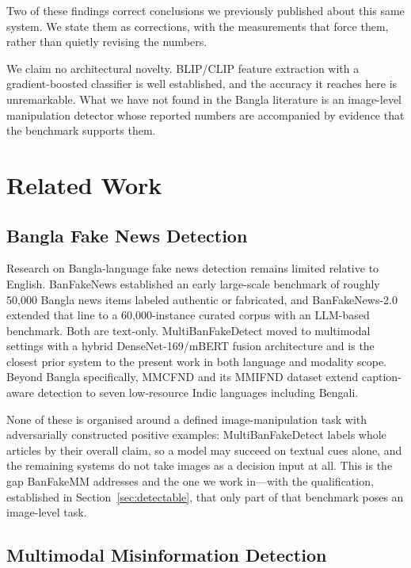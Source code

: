 Two of these findings correct conclusions we previously published about this
same system. We state them as corrections, with the measurements that force
them, rather than quietly revising the numbers.

We claim no architectural novelty. BLIP/CLIP feature extraction with a
gradient-boosted classifier is well established, and the accuracy it reaches
here is unremarkable. What we have not found in the Bangla literature is an
image-level manipulation detector whose reported numbers are accompanied by
evidence that the benchmark supports them.

\section{Related Work}

\subsection{Bangla Fake News Detection}

Research on Bangla-language fake news detection remains limited relative to
English. BanFakeNews \cite{banfakenews} established an early large-scale
benchmark of roughly 50{,}000 Bangla news items labeled authentic or
fabricated, and BanFakeNews-2.0 \cite{banfakenews2} extended that line to a
60{,}000-instance curated corpus with an LLM-based benchmark. Both are
text-only. MultiBanFakeDetect \cite{multibanfake} moved to multimodal
settings with a hybrid DenseNet-169/mBERT fusion architecture and is the
closest prior system to the present work in both language and modality scope.
Beyond Bangla specifically, MMCFND and its MMIFND dataset \cite{mmcfnd} extend
caption-aware detection to seven low-resource Indic languages including
Bengali.

None of these is organised around a defined image-manipulation task with
adversarially constructed positive examples: MultiBanFakeDetect labels whole
articles by their overall claim, so a model may succeed on textual cues alone,
and the remaining systems do not take images as a decision input at all. This
is the gap BanFakeMM \cite{banfakemm} addresses and the one we work in---with
the qualification, established in Section~\ref{sec:detectable}, that only part
of that benchmark poses an image-level task.

\subsection{Multimodal Misinformation Detection}

